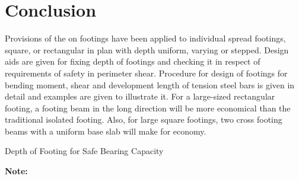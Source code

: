 \section{Conclusion}
Provisions of the   on footings have been applied to individual spread
footings, square, or rectangular in plan with depth uniform, varying or 
stepped. Design aids are given for  fixing depth of footings and checking
it in respect of requirements of safety in perimeter shear. Procedure for
design of footings for bending moment, shear and development length of 
tension steel bars is given in detail and examples are given to illustrate it.
For a large-sized rectangular footing, a footing beam in the long direction 
will be more economical than the traditional isolated footing. Also, for
large square footings, two cross footing beams with a uniform base slab
will make for economy.

\begin{table}[h!]\centering
        \caption{Depth of Footing for Safe Bearing Capacity}
        \label{chaptertable}
\end{table}

\textbf{Note:}

~\cite{is4562000}
~\cite{aci1981aci}
~\cite{aci31877}
\printbibliography
